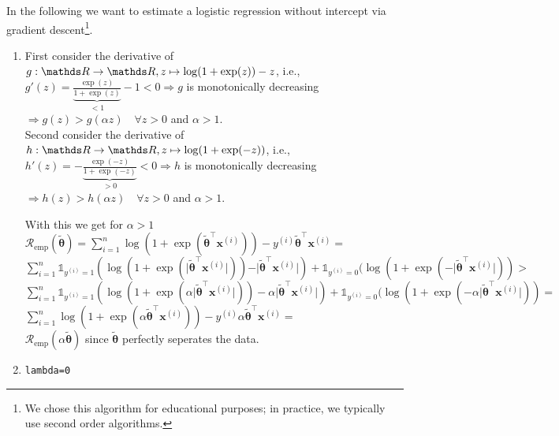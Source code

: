 \documentclass[a4paper]{article}
\makeatletter
\newcommand{\hlnum}[1]{\textcolor[rgb]{0.686,0.059,0.569}{#1}}%
\newcommand{\hlstd}[1]{\textcolor[rgb]{0.345,0.345,0.345}{#1}}%
\newcommand{\hlkwb}[1]{\textcolor[rgb]{0.69,0.353,0.396}{#1}}%
\newenvironment{kframe}{%
 \def\at@end@of@kframe{}%
 \ifinner\ifhmode%
  \def\at@end@of@kframe{\end{minipage}}%
  \begin{minipage}{\columnwidth}%
 \fi\fi%
 \def\FrameCommand##1{\hskip\@totalleftmargin \hskip-\fboxsep
 \colorbox{shadecolor}{##1}\hskip-\fboxsep
     \hskip-\linewidth \hskip-\@totalleftmargin \hskip\columnwidth}%
 \MakeFramed {\advance\hsize-\width
   \@totalleftmargin\z@ \linewidth\hsize
   \@setminipage}}%
 {\par\unskip\endMakeFramed%
 \at@end@of@kframe}
\newenvironment{knitrout}{}{} %
\makeatother
\begin{document}
{In the following we want to estimate a logistic regression without intercept via gradient descent\footnote{We chose this algorithm for educational purposes; in practice, we typically use second order algorithms.}.
\begin{enumerate}
\item  
First consider the derivative of $g:\R \rightarrow \R, z\mapsto \log(1+\exp(z)) - z$, i.e.,\\
$g'(z) = \underbrace{\frac{\exp(z)}{1+\exp(z)}}_{< 1} - 1 < 0 \Rightarrow g$ is monotonically decreasing $\Rightarrow g(z) > g(\alpha z) \quad \forall z > 0$ and $\alpha > 1.$
\\
Second consider the derivative of $h:\R \rightarrow \R, z\mapsto \log(1+\exp(-z))$, i.e.,\\
$h'(z) = -\underbrace{\frac{\exp(-z)}{1+\exp(-z)}}_{>0} < 0 \Rightarrow h$ is monotonically decreasing $\Rightarrow h(z) > h(\alpha z) \quad \forall z > 0$ and $\alpha > 1.$

With this we get for $\alpha > 1$ \\
$\mathcal{R}_\text{emp}(\tilde{\bm{\theta}}) = \sum^n_{i=1} \log(1 + \exp(\tilde{\bm{\theta}}^\top \mathbf{x}^{(i)})) - y^{(i)}\tilde{\bm{\theta}}^\top \mathbf{x}^{(i)} =$\\
$\sum^n_{i=1} \mathds{1}_{y^{(i)} = 1} (\log(1 + \exp(\vert\tilde{\bm{\theta}}^\top \mathbf{x}^{(i)}\vert)) - \vert\tilde{\bm{\theta}}^\top \mathbf{x}^{(i)}\vert) + \mathds{1}_{y^{(i)} = 0} (\log(1 + \exp(-\vert\tilde{\bm{\theta}}^\top \mathbf{x}^{(i)}\vert)) > $ \\
$\sum^n_{i=1} \mathds{1}_{y^{(i)} = 1} (\log(1 + \exp(\alpha\vert\tilde{\bm{\theta}}^\top \mathbf{x}^{(i)}\vert)) - \alpha\vert\tilde{\bm{\theta}}^\top \mathbf{x}^{(i)}\vert) + \mathds{1}_{y^{(i)} = 0} (\log(1 + \exp(-\alpha\vert\tilde{\bm{\theta}}^\top \mathbf{x}^{(i)}\vert)) = $ \\
$\sum^n_{i=1} \log(1 + \exp(\alpha\tilde{\bm{\theta}}^\top \mathbf{x}^{(i)})) - y^{(i)}\alpha\tilde{\bm{\theta}}^\top \mathbf{x}^{(i)} =$\\
$\mathcal{R}_\text{emp}(\alpha\tilde{\bm{\theta}})$ 
since $\tilde{\bm{\theta}}$ perfectly seperates the data.

\item
\begin{knitrout}
\color{fgcolor}\begin{kframe}
\begin{alltt}
\hlstd{lambda} \hlkwb{=} \hlnum{0}


\end{alltt}
\end{kframe}
\end{knitrout}
\end{enumerate}}
\end{document}
